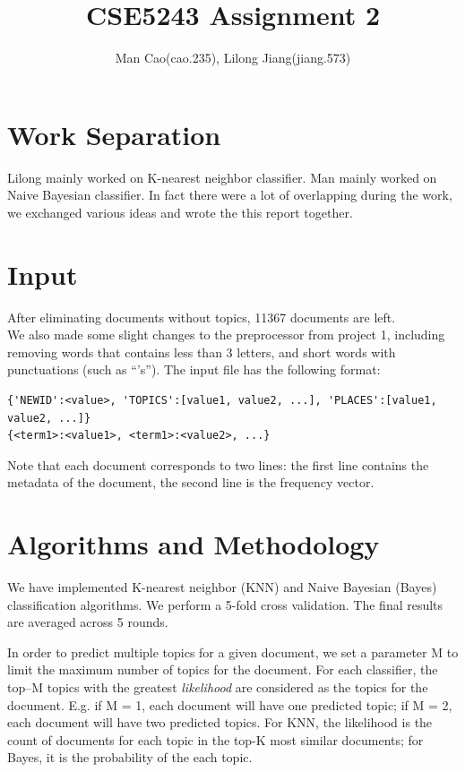 \documentclass{article}
\begin{document}
\title{CSE5243 Assignment 2}
\author{Man Cao(cao.235), Lilong Jiang(jiang.573)}
\maketitle

\section{Work Separation}
Lilong mainly worked on K-nearest neighbor classifier. Man mainly worked on
Naive Bayesian classifier. In fact there were a lot of overlapping during the
work, we exchanged various ideas and wrote the this report together.
\section{Input}
After eliminating documents without topics, 11367 documents are left.\\
We also made some slight changes to the preprocessor from project 1, including
removing words that contains less than 3 letters, and short words with
punctuations (such as ``'s'').
The input file has the following format:
\begin{verbatim}
{'NEWID':<value>, 'TOPICS':[value1, value2, ...], 'PLACES':[value1, value2, ...]}
{<term1>:<value1>, <term1>:<value2>, ...}
\end{verbatim}
Note that each document corresponds to two lines: the first line contains the
metadata of the document, the second line is the frequency vector.

\section{Algorithms and Methodology}
We have implemented K-nearest neighbor (KNN) and Naive Bayesian (Bayes) classification algorithms.
We perform a 5-fold cross validation. The final results are averaged across 5
rounds.

In order to predict multiple topics for a given document, we set a parameter M
to limit the maximum number of topics for the document.
For each classifier, the top--M topics with the greatest \emph{likelihood} are
considered as the topics for the document. E.g. if M = 1, each document will
have one predicted topic; if M = 2, each document will have two predicted topics.
For KNN, the likelihood is the count of documents for each topic in the top-K most similar documents;
for Bayes, it is the probability of the each topic.
\end{document}
